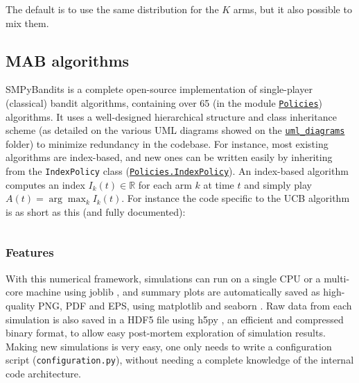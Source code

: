 The default is to use the same distribution for the $K$ arms, but it also possible to mix them.



\subsection{MAB algorithms}

SMPyBandits is a complete open-source implementation of single-player (classical) bandit algorithms,
containing over 65 (in the module \texttt{\href{https://SMPyBandits.GitHub.io/docs/Policies.html}{Policies}}) algorithms.
It uses a well-designed hierarchical structure and class inheritance scheme (as detailed on the various UML diagrams showed on the \texttt{\href{https://SMPyBandits.GitHub.io/uml_diagrams/README.html}{uml\_diagrams}} folder) to minimize redundancy in the codebase.
For instance, most existing algorithms are index-based, and new ones can be written easily by inheriting from the \texttt{IndexPolicy} class (\texttt{\href{https://SMPyBandits.GitHub.io/docs/Policies.IndexPolicy.html}{Policies.IndexPolicy}}).
An index-based algorithm computes an index $I_k(t)\in\mathbb{R}$ for each arm $k$ at time $t$ and simply play $A(t) = \arg\max_k I_k(t)$.
For instance the code specific to the UCB algorithm \cite{LaiRobbins85,Auer02} is as short as this (and fully documented):

\begin{small}
    \inputminted[linenos=true,numbersep=5pt,frame=lines,framesep=2mm]{python3}{2-Chapters/3-Chapter/src/example_of_a_IndexPolicy_UCB.py}
\end{small}


\subsubsection{Features}

With this numerical framework, simulations can run on a single CPU or a multi-core machine using joblib \cite{joblib},
and summary plots are automatically saved as high-quality PNG, PDF and EPS, using matplotlib \cite{matplotlib} and seaborn \cite{seaborn}.
Raw data from each simulation is also saved in a HDF5 file using h5py \cite{h5py}, an efficient and compressed binary format, to allow easy post-mortem exploration of simulation results.
Making new simulations is very easy, one only needs to write a configuration script (\texttt{configuration.py}), without needing a complete knowledge of the internal code architecture.

